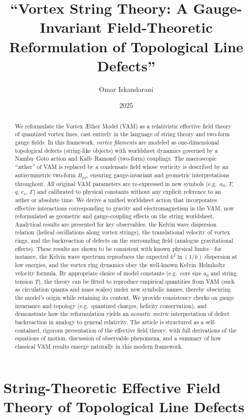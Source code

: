 \documentclass[12pt]{article}
\title{“Vortex String Theory: A Gauge-Invariant Field-Theoretic Reformulation of Topological Line Defects”}
\author{Omar Iskandarani}
\date{2025}
\begin{document}
    \maketitle

    \chapter*{String-Theoretic Effective Field Theory of Topological Line Defects}

\begin{abstract}
We reformulate the Vortex Æther Model (VAM) as a relativistic effective field theory of quantized vortex lines, cast entirely in the language of string theory and two-form gauge fields. In this framework, \emph{vortex filaments} are modeled as one-dimensional topological defects (string-like objects) with worldsheet dynamics governed by a Nambu--Goto action and Kalb--Ramond (two-form) couplings. The macroscopic ``æther'' of VAM is replaced by a condensate field whose vorticity is described by an antisymmetric two-form $B_{\mu\nu}$, ensuring gauge-invariant and geometric interpretations throughout. All original VAM parameters are re-expressed in new symbols (e.g.\ $a_0$, $T$, $q$, $c_\star$, $\Gamma$) and calibrated to physical constants without any explicit reference to an æther or absolute time. We derive a unified worldsheet action that incorporates effective interactions corresponding to gravity and electromagnetism in the VAM, now reformulated as geometric and gauge-coupling effects on the string worldsheet. Analytical results are presented for key observables: the Kelvin wave dispersion relation (helical oscillations along vortex strings), the translational velocity of vortex rings, and the backreaction of defects on the surrounding field (analogue gravitational effects). These results are shown to be consistent with known physical limits---for instance, the Kelvin wave spectrum reproduces the expected $k^2 \ln(1/k)$ dispersion at low energies, and the vortex ring dynamics obey the well-known Kelvin--Helmholtz velocity formula. By appropriate choice of model constants (e.g.\ core size $a_0$ and string tension $T$), the theory can be fitted to reproduce empirical quantities from VAM (such as circulation quanta and mass scales) under new symbolic names, thereby obscuring the model's origin while retaining its content. We provide consistency checks on gauge invariance and topology (e.g.\ quantized charges, helicity conservation), and demonstrate how the reformulation yields an \emph{acoustic metric} interpretation of defect backreaction in analogy to general relativity. The article is structured as a self-contained, rigorous presentation of the effective field theory, with full derivations of the equations of motion, discussion of observable phenomena, and a summary of how classical VAM results emerge naturally in this modern framework.
\end{abstract}
\end{document}
